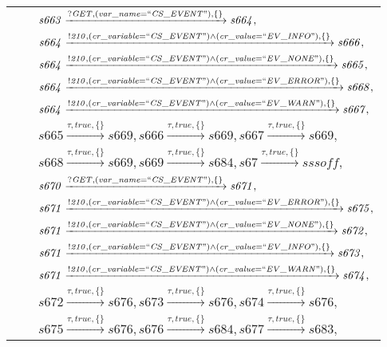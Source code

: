 \begin{tabular}{lcl}
& & $\mathit{s663}\xrightarrow{\mathit{?GET}, \mathit{(var\_name = ``CS\_EVENT")}, \{\}}\mathit{s664},$ \\
& & $\mathit{s664}\xrightarrow{\mathit{!210}, \mathit{(cr\_variable = ``CS\_EVENT") \land (cr\_value = ``EV\_INFO")}, \{\}}\mathit{s666},$ \\
& & $\mathit{s664}\xrightarrow{\mathit{!210}, \mathit{(cr\_variable = ``CS\_EVENT") \land (cr\_value = ``EV\_NONE")}, \{\}}\mathit{s665},$ \\
& & $\mathit{s664}\xrightarrow{\mathit{!210}, \mathit{(cr\_variable = ``CS\_EVENT") \land (cr\_value = ``EV\_ERROR")}, \{\}}\mathit{s668},$ \\
& & $\mathit{s664}\xrightarrow{\mathit{!210}, \mathit{(cr\_variable = ``CS\_EVENT") \land (cr\_value = ``EV\_WARN")}, \{\}}\mathit{s667},$ \\
& & $\mathit{s665}\xrightarrow{\mathit{\tau}, \mathit{true}, \{\}}\mathit{s669},\mathit{s666}\xrightarrow{\mathit{\tau}, \mathit{true}, \{\}}\mathit{s669},\mathit{s667}\xrightarrow{\mathit{\tau}, \mathit{true}, \{\}}\mathit{s669},$ \\
& & $\mathit{s668}\xrightarrow{\mathit{\tau}, \mathit{true}, \{\}}\mathit{s669},\mathit{s669}\xrightarrow{\mathit{\tau}, \mathit{true}, \{\}}\mathit{s684},\mathit{s67}\xrightarrow{\mathit{\tau}, \mathit{true}, \{\}}\mathit{sssoff},$ \\
& & $\mathit{s670}\xrightarrow{\mathit{?GET}, \mathit{(var\_name = ``CS\_EVENT")}, \{\}}\mathit{s671},$ \\
& & $\mathit{s671}\xrightarrow{\mathit{!210}, \mathit{(cr\_variable = ``CS\_EVENT") \land (cr\_value = ``EV\_ERROR")}, \{\}}\mathit{s675},$ \\
& & $\mathit{s671}\xrightarrow{\mathit{!210}, \mathit{(cr\_variable = ``CS\_EVENT") \land (cr\_value = ``EV\_NONE")}, \{\}}\mathit{s672},$ \\
& & $\mathit{s671}\xrightarrow{\mathit{!210}, \mathit{(cr\_variable = ``CS\_EVENT") \land (cr\_value = ``EV\_INFO")}, \{\}}\mathit{s673},$ \\
& & $\mathit{s671}\xrightarrow{\mathit{!210}, \mathit{(cr\_variable = ``CS\_EVENT") \land (cr\_value = ``EV\_WARN")}, \{\}}\mathit{s674},$ \\
& & $\mathit{s672}\xrightarrow{\mathit{\tau}, \mathit{true}, \{\}}\mathit{s676},\mathit{s673}\xrightarrow{\mathit{\tau}, \mathit{true}, \{\}}\mathit{s676},\mathit{s674}\xrightarrow{\mathit{\tau}, \mathit{true}, \{\}}\mathit{s676},$ \\
& & $\mathit{s675}\xrightarrow{\mathit{\tau}, \mathit{true}, \{\}}\mathit{s676},\mathit{s676}\xrightarrow{\mathit{\tau}, \mathit{true}, \{\}}\mathit{s684},\mathit{s677}\xrightarrow{\mathit{\tau}, \mathit{true}, \{\}}\mathit{s683},$ \\

\end{tabular}

